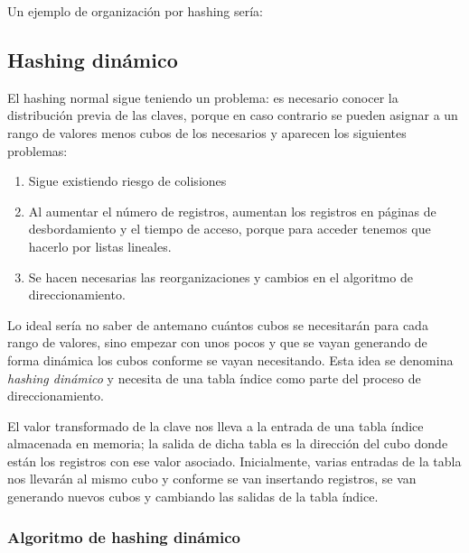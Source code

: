 \documentclass[10pt,a4paper,spanish]{report}
\begin{document}
Un ejemplo de organización por hashing sería:

\begin{center}

\end{center}

\textcolor[rgb]{1,0.2,0.3}{\subsection{Hashing dinámico}}
El hashing normal sigue teniendo un problema: es necesario conocer la distribución previa de las claves, porque en caso contrario se pueden asignar a un rango de valores menos cubos de los necesarios y aparecen los siguientes problemas:

\begin{enumerate}[$\heartsuit$]
    \item Sigue existiendo riesgo de colisiones
    \item Al aumentar el número de registros, aumentan los registros en páginas de desbordamiento y el tiempo de acceso, porque para acceder tenemos que hacerlo por listas lineales.
    \item Se hacen necesarias las reorganizaciones y cambios en el algoritmo de direccionamiento.
\end{enumerate}

Lo ideal sería no saber de antemano cuántos cubos se necesitarán para cada rango de valores, sino empezar con unos pocos y que se vayan generando de forma dinámica los cubos conforme se vayan necesitando. Esta idea se denomina \textcolor[rgb]{1,0.2,0.3}{\textit{hashing dinámico}} y necesita de una tabla índice como parte del proceso de direccionamiento.

El valor transformado de la clave nos lleva a la entrada de una tabla índice almacenada en memoria; la salida de dicha tabla es la dirección del cubo donde están los registros con ese valor asociado. Inicialmente, varias entradas de la tabla nos llevarán al mismo cubo y conforme se van insertando registros, se van generando nuevos cubos y cambiando las salidas de la tabla índice.

\textcolor[rgb]{1,0.2,0.3}{\subsubsection{Algoritmo de hashing dinámico}}
\end{document}
